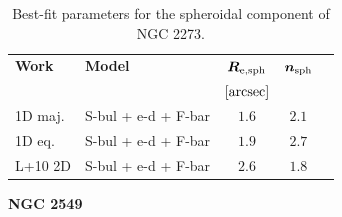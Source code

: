\documentclass[preprint2]{emulateapj}
\begin{document}
  \begin{table}[h]
  \small
  \caption{Best-fit parameters for the spheroidal component of NGC 2273.}
  \begin{center}
  \begin{tabular}{llccc}
  \hline
  {\bf Work} & {\bf Model}   & $\bm R_{\rm e,sph}$    & $\bm n_{\rm sph}$ \\
    &  &  $[\rm arcsec]$ & \\
  \hline
  1D maj. & S-bul + e-d + F-bar & $1.6$  &  $2.1$ \\
  1D eq.  & S-bul + e-d + F-bar & $1.9$  &  $2.7$ \\
  \hline
  L+10 2D         & S-bul + e-d + F-bar & $2.6$  &  $1.8$ \\
  \hline
  \end{tabular}
  \end{center}
  \label{tab:n2273}
  \end{table}

  \clearpage\newpage\noindent
  {\bf NGC 2549 \\}
  
\end{document}
